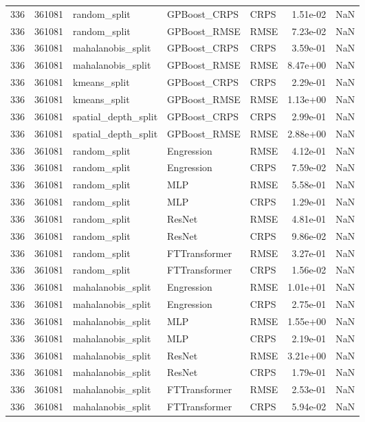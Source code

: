 \begin{tabular}{rrlllrr}
336 & 361081 & random\_split & GPBoost\_CRPS & CRPS & 1.51e-02 & NaN \\
336 & 361081 & random\_split & GPBoost\_RMSE & RMSE & 7.23e-02 & NaN \\
336 & 361081 & mahalanobis\_split & GPBoost\_CRPS & CRPS & 3.59e-01 & NaN \\
336 & 361081 & mahalanobis\_split & GPBoost\_RMSE & RMSE & 8.47e+00 & NaN \\
336 & 361081 & kmeans\_split & GPBoost\_CRPS & CRPS & 2.29e-01 & NaN \\
336 & 361081 & kmeans\_split & GPBoost\_RMSE & RMSE & 1.13e+00 & NaN \\
336 & 361081 & spatial\_depth\_split & GPBoost\_CRPS & CRPS & 2.99e-01 & NaN \\
336 & 361081 & spatial\_depth\_split & GPBoost\_RMSE & RMSE & 2.88e+00 & NaN \\
336 & 361081 & random\_split & Engression & RMSE & 4.12e-01 & NaN \\
336 & 361081 & random\_split & Engression & CRPS & 7.59e-02 & NaN \\
336 & 361081 & random\_split & MLP & RMSE & 5.58e-01 & NaN \\
336 & 361081 & random\_split & MLP & CRPS & 1.29e-01 & NaN \\
336 & 361081 & random\_split & ResNet & RMSE & 4.81e-01 & NaN \\
336 & 361081 & random\_split & ResNet & CRPS & 9.86e-02 & NaN \\
336 & 361081 & random\_split & FTTransformer & RMSE & 3.27e-01 & NaN \\
336 & 361081 & random\_split & FTTransformer & CRPS & 1.56e-02 & NaN \\
336 & 361081 & mahalanobis\_split & Engression & RMSE & 1.01e+01 & NaN \\
336 & 361081 & mahalanobis\_split & Engression & CRPS & 2.75e-01 & NaN \\
336 & 361081 & mahalanobis\_split & MLP & RMSE & 1.55e+00 & NaN \\
336 & 361081 & mahalanobis\_split & MLP & CRPS & 2.19e-01 & NaN \\
336 & 361081 & mahalanobis\_split & ResNet & RMSE & 3.21e+00 & NaN \\
336 & 361081 & mahalanobis\_split & ResNet & CRPS & 1.79e-01 & NaN \\
336 & 361081 & mahalanobis\_split & FTTransformer & RMSE & 2.53e-01 & NaN \\
336 & 361081 & mahalanobis\_split & FTTransformer & CRPS & 5.94e-02 & NaN \\

\end{tabular}
